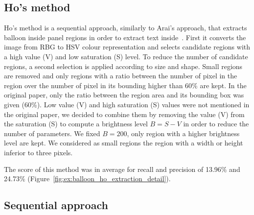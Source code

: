 \subsection{Ho's method~\cite{Ho2012}} %

Ho's method is a sequential approach, similarly to Arai's approach, that extracts balloon inside panel regions in order to extract text inside~\cite{Ho2012}.
First it converts the image from RBG to HSV colour representation and selects candidate regions with a high value (V) and low saturation (S) level.
To reduce the number of candidate regions, a second selection is applied according to size and shape.
Small regions are removed and only regions with a ratio between the number of pixel in the region over the number of pixel in its bounding higher than 60\% are kept.
In the original paper, only the ratio between the region area and its bounding box was given (60\%).
Low value (V) and high saturation (S) values were not mentioned in the original paper, we decided to combine them by removing the value (V) from the saturation (S) to compute a brightness level $B=S-V$ in order to reduce the number of parameters.
We fixed $B=200$, only region with a higher brightness level are kept.
We considered as small regions the region with a width or height inferior to three pixels.

The score of this method was in average for recall and precision of 13.96\% and 24.73\% (Figure~\ref{fig:ex:balloon_ho_extraction_detail}).




\subsection{Sequential approach} %

